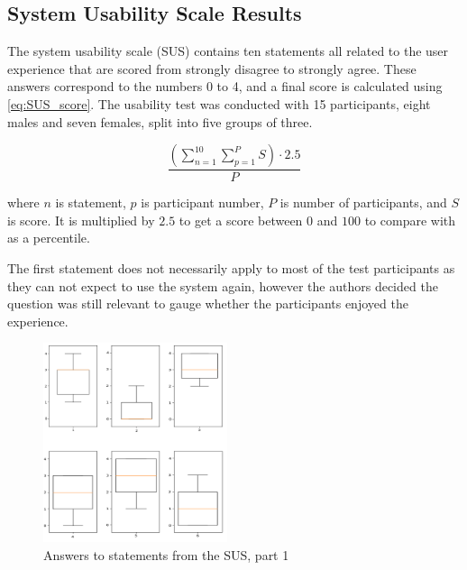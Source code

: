 \graphicspath{{fake_results/}}
\subsection{System Usability Scale Results}

The system usability scale (SUS) contains ten statements all related to the user experience that are scored from strongly disagree to strongly agree. These answers correspond to the numbers 0 to 4, and a final score is calculated using \autoref{eq:SUS_score}. The usability test was conducted with 15 participants, eight males and seven females, split into five groups of three.

\begin{equation}
	\frac{(\sum\limits_{n=1}^{10} \sum\limits_{p=1}^{P} S) \cdot 2.5 }{P}
	\label{eq:SUS_score}
\end{equation}

where $ n $ is statement, $ p $ is participant number, $ P $ is number of participants, and $ S $ is score. It is multiplied by $2.5$ to get a score between $ 0 $ and $ 100 $ to compare with as a percentile. %

The first statement does not necessarily apply to most of the test participants as they can not expect to use the system again, however the authors decided the question was still relevant to gauge whether the participants enjoyed the experience. 

\begin{figure}
\centering
\includegraphics[width=0.48\textwidth]{Page1.png}
\caption{Answers to statements from the SUS, part 1}
\label{fig:one}
\end{figure}

